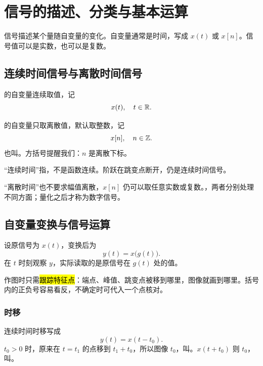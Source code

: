 
\chapter{信号的描述、分类与基本运算}
\label{chap:signals}

信号描述某个量随自变量的变化。自变量通常是时间，写成 $x(t)$ 或 $x[n]$。信号值可以是实数，也可以是复数。

\section{连续时间信号与离散时间信号}
\label{sec:continuous-and-discrete-signals}

\begin{definition}[连续时间信号]
  \label{def:continuous-time-signal}
  的自变量连续取值，记
  \[
    x(t),\quad t\in\mathbb{R}.
  \]
\end{definition}

\begin{definition}[离散时间信号]
  \label{def:discrete-time-signal}
  的自变量只取离散值，默认取整数，记
  \[
    x[n],\quad n\in\mathbb{Z}.
  \]
  也叫。方括号提醒我们：$n$ 是离散下标。
\end{definition}

“连续时间”指，不是函数连续。阶跃在跳变点断开，仍是连续时间信号。

“离散时间”也不要求幅值离散，$x[n]$ 仍可以取任意实数或复数。，两者分别处理不同方面；量化之后才称为数字信号。

\section{自变量变换与信号运算}
\label{sec:independent-variable-transformations}

设原信号为 $x(t)$，变换后为
\[
  y(t)=x\bigl(g(t)\bigr).
\]
在 $t$ 时刻观察 $y$，实际读取的是原信号在 $g(t)$ 处的值。

作图时只需\hl{跟踪特征点}：端点、峰值、跳变点被移到哪里，图像就画到哪里。括号内的正负号容易看反，不确定时可代入一个点核对。

\subsection{时移}

连续时间时移写成
\begin{equation}
  y(t)=x(t-t_0).
  \label{eq:continuous-time-shift}
\end{equation}
$t_0>0$ 时，原来在 $t=t_1$ 的点移到 $t_1+t_0$，所以图像 $t_0$，叫。$x(t+t_0)$ 则 $t_0$，叫。

